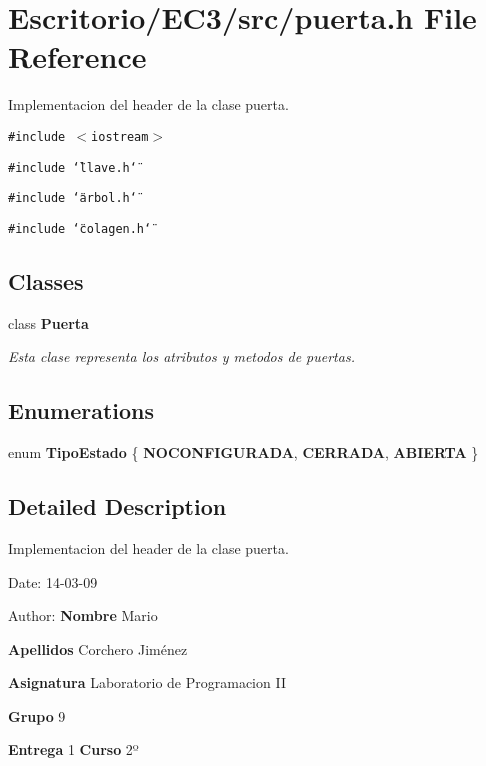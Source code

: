 \section{Escritorio/EC3/src/puerta.h File Reference}
\label{puerta_8h}
Implementacion del header de la clase puerta. 

{\tt \#include $<$iostream$>$}\par
{\tt \#include \char`\"{}llave.h\char`\"{}}\par
{\tt \#include \char`\"{}arbol.h\char`\"{}}\par
{\tt \#include \char`\"{}colagen.h\char`\"{}}\par
\subsection*{Classes}
\begin{CompactItemize}
\item 
class {\bf Puerta}
\begin{CompactList}\small\item\em Esta clase representa los atributos y metodos de puertas. \item\end{CompactList}\end{CompactItemize}
\subsection*{Enumerations}
\begin{CompactItemize}
\item 
enum {\bf TipoEstado} \{ {\bf NOCONFIGURADA}, 
{\bf CERRADA}, 
{\bf ABIERTA}
 \}
\end{CompactItemize}


\subsection{Detailed Description}
Implementacion del header de la clase puerta. 

\begin{Desc}
\item[Date:]14-03-09 \end{Desc}
\begin{Desc}
\item[Author:]{\bf Nombre} Mario \par
 {\bf Apellidos} Corchero Jiménez \par
 {\bf Asignatura} Laboratorio de Programacion II \par
 {\bf Grupo} 9 \par
 {\bf Entrega} 1 {\bf Curso} 2º \end{Desc}


